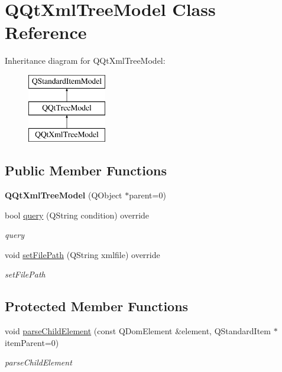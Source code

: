 \hypertarget{class_q_qt_xml_tree_model}{}\section{Q\+Qt\+Xml\+Tree\+Model Class Reference}
\label{class_q_qt_xml_tree_model}
Inheritance diagram for Q\+Qt\+Xml\+Tree\+Model\+:\begin{figure}[H]
\begin{center}
\leavevmode
\includegraphics[height=3.000000cm]{class_q_qt_xml_tree_model}
\end{center}
\end{figure}
\subsection*{Public Member Functions}
\begin{DoxyCompactItemize}
\item 
\mbox{\label{class_q_qt_xml_tree_model_af26ae5de08cfe8a913f1d8139e655cbb}} 
{\bfseries Q\+Qt\+Xml\+Tree\+Model} (Q\+Object $\ast$parent=0)
\item 
bool \mbox{\hyperlink{class_q_qt_xml_tree_model_a0b9bb00bcd6605d6c3988b680f3b51fb}{query}} (Q\+String condition) override
\begin{DoxyCompactList}\small\item\em query \end{DoxyCompactList}\item 
void \mbox{\hyperlink{class_q_qt_xml_tree_model_a66f2bb18d1af1ce2df8f22cad0bc5120}{set\+File\+Path}} (Q\+String xmlfile) override
\begin{DoxyCompactList}\small\item\em set\+File\+Path \end{DoxyCompactList}\end{DoxyCompactItemize}
\subsection*{Protected Member Functions}
\begin{DoxyCompactItemize}
\item 
void \mbox{\hyperlink{class_q_qt_xml_tree_model_af93441ab5f1d8d0c91c4bbab42f4d690}{parse\+Child\+Element}} (const Q\+Dom\+Element \&element, Q\+Standard\+Item $\ast$item\+Parent=0)
\begin{DoxyCompactList}\small\item\em parse\+Child\+Element \end{DoxyCompactList}\end{DoxyCompactItemize}


